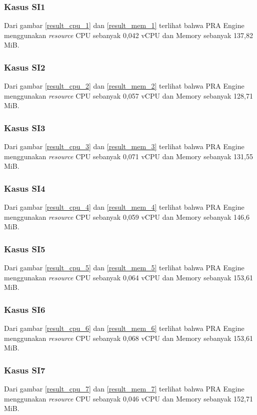 \subsubsection{Kasus SI1}
Dari gambar \ref{result_cpu_1} dan \ref{result_mem_1} terlihat bahwa PRA Engine menggunakan \textit{resource} CPU sebanyak 0,042 vCPU dan Memory sebanyak 137,82 MiB. 

\subsubsection{Kasus SI2}
Dari gambar \ref{result_cpu_2} dan \ref{result_mem_2} terlihat bahwa PRA Engine menggunakan \textit{resource} CPU sebanyak 0,057 vCPU dan Memory sebanyak 128,71 MiB. 

\subsubsection{Kasus SI3}
Dari gambar \ref{result_cpu_3} dan \ref{result_mem_3} terlihat bahwa PRA Engine menggunakan \textit{resource} CPU sebanyak 0,071 vCPU dan Memory sebanyak 131,55 MiB. 

\subsubsection{Kasus SI4}
Dari gambar \ref{result_cpu_4} dan \ref{result_mem_4} terlihat bahwa PRA Engine menggunakan \textit{resource} CPU sebanyak 0,059 vCPU dan Memory sebanyak 146,6 MiB. 


\subsubsection{Kasus SI5}
Dari gambar \ref{result_cpu_5} dan \ref{result_mem_5} terlihat bahwa PRA Engine menggunakan \textit{resource} CPU sebanyak 0,064 vCPU dan Memory sebanyak 153,61 MiB. 


\subsubsection{Kasus SI6}
Dari gambar \ref{result_cpu_6} dan \ref{result_mem_6} terlihat bahwa PRA Engine menggunakan \textit{resource} CPU sebanyak 0,068 vCPU dan Memory sebanyak 153,61 MiB. 


\subsubsection{Kasus SI7}
Dari gambar \ref{result_cpu_7} dan \ref{result_mem_7} terlihat bahwa PRA Engine menggunakan \textit{resource} CPU sebanyak 0,046 vCPU dan Memory sebanyak 152,71 MiB. 


